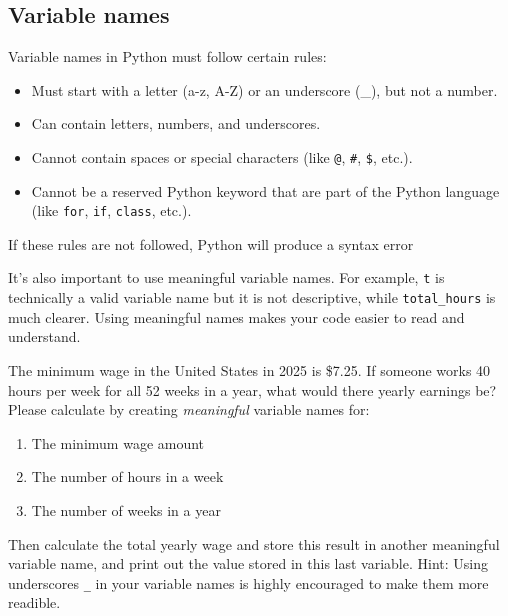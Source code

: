 \documentclass[
  letterpaper,
  DIV=11,
  numbers=noendperiod]{scrreprt}
\providecommand{\tightlist}{%
  \setlength{\itemsep}{0pt}\setlength{\parskip}{0pt}}\usepackage{longtable,booktabs,array}
\begin{document}
\subsection{Variable names}\label{variable-names}

Variable names in Python must follow certain rules:

\begin{itemize}
\tightlist
\item
  Must start with a letter (a-z, A-Z) or an underscore (\_), but not a
  number.
\item
  Can contain letters, numbers, and underscores.
\item
  Cannot contain spaces or special characters (like \texttt{@},
  \texttt{\#}, \texttt{\$}, etc.).
\item
  Cannot be a reserved Python keyword that are part of the Python
  language (like \texttt{for}, \texttt{if}, \texttt{class}, etc.).
\end{itemize}

If these rules are not followed, Python will produce a syntax error

It's also important to use meaningful variable names. For example,
\texttt{t} is technically a valid variable name but it is not
descriptive, while \texttt{total\_hours} is much clearer. Using
meaningful names makes your code easier to read and understand.

\begin{tcolorbox}[enhanced jigsaw, colframe=quarto-callout-tip-color-frame, toprule=.15mm, left=2mm, breakable, colbacktitle=quarto-callout-tip-color!10!white, arc=.35mm, opacityback=0, colback=white, leftrule=.75mm, title=\textcolor{quarto-callout-tip-color}{\faLightbulb}\hspace{0.5em}{Exercise}, bottomrule=.15mm, bottomtitle=1mm, toptitle=1mm, titlerule=0mm, rightrule=.15mm, opacitybacktitle=0.6, coltitle=black]

The minimum wage in the United States in 2025 is \$7.25. If someone
works 40 hours per week for all 52 weeks in a year, what would there
yearly earnings be? Please calculate by creating \emph{meaningful}
variable names for:

\begin{enumerate}
\def\labelenumi{\arabic{enumi}.}
\tightlist
\item
  The minimum wage amount\\
\item
  The number of hours in a week\\
\item
  The number of weeks in a year
\end{enumerate}

Then calculate the total yearly wage and store this result in another
meaningful variable name, and print out the value stored in this last
variable. Hint: Using underscores \texttt{\_} in your variable names is
highly encouraged to make them more readible.

\end{tcolorbox}
\end{document}
